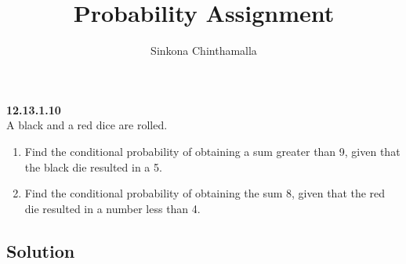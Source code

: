 \documentclass[10pt,twocolumn]{article}
\title{\textbf{Probability Assignment}}
\author{Sinkona Chinthamalla}
\begin{document}
\maketitle

\textbf {12.13.1.10} \\
A black and a red dice are rolled.
\begin{enumerate}
\item Find the conditional probability of obtaining a sum greater than 9, given that the black die resulted in a 5.
\item Find the conditional probability of obtaining the sum 8, given that the red die resulted in a number less than 4.
\end{enumerate}

\subsection*{Solution}
\end{document}
